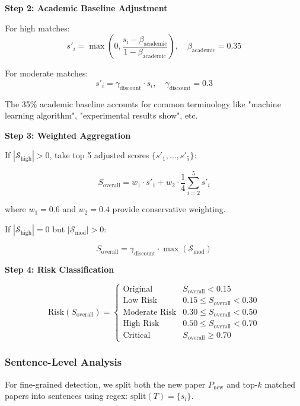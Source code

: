 \documentclass[conference]{IEEEtran}
\begin{document}
\textbf{Step 2: Academic Baseline Adjustment}

For high matches:
\begin{equation}
s'_i = \max\left(0, \frac{s_i - \beta_{\text{academic}}}{1 - \beta_{\text{academic}}}\right), \quad \beta_{\text{academic}} = 0.35
\end{equation}

For moderate matches:
\begin{equation}
s'_i = \gamma_{\text{discount}} \cdot s_i, \quad \gamma_{\text{discount}} = 0.3
\end{equation}

The 35\% academic baseline accounts for common terminology like "machine learning algorithm", "experimental results show", etc.

\textbf{Step 3: Weighted Aggregation}

If $|\mathcal{S}_{\text{high}}| > 0$, take top 5 adjusted scores $\{s'_1, \ldots, s'_5\}$:

\begin{equation}
S_{\text{overall}} = w_1 \cdot s'_1 + w_2 \cdot \frac{1}{4}\sum_{i=2}^{5} s'_i
\end{equation}

where $w_1 = 0.6$ and $w_2 = 0.4$ provide conservative weighting.

If $|\mathcal{S}_{\text{high}}| = 0$ but $|\mathcal{S}_{\text{mod}}| > 0$:

\begin{equation}
S_{\text{overall}} = \gamma_{\text{discount}} \cdot \max(\mathcal{S}_{\text{mod}})
\end{equation}

\textbf{Step 4: Risk Classification}

\begin{equation}
\text{Risk}(S_{\text{overall}}) = \begin{cases}
\text{Original} & S_{\text{overall}} < 0.15 \\
\text{Low Risk} & 0.15 \leq S_{\text{overall}} < 0.30 \\
\text{Moderate Risk} & 0.30 \leq S_{\text{overall}} < 0.50 \\
\text{High Risk} & 0.50 \leq S_{\text{overall}} < 0.70 \\
\text{Critical} & S_{\text{overall}} \geq 0.70
\end{cases}
\end{equation}

\subsubsection{Sentence-Level Analysis}
For fine-grained detection, we split both the new paper $P_{\text{new}}$ and top-$k$ matched papers into sentences using regex: $\text{split}(T) = \{s_i\}$.
\end{document}
